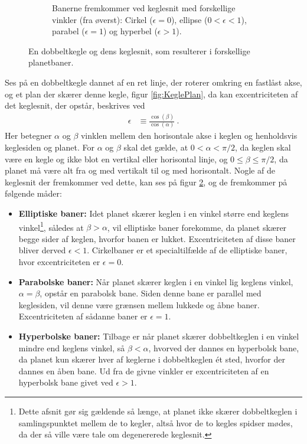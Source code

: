 \begin{figure}[h!]
\begin{subfigure}{0.45\textwidth}
		\caption{Banerne fremkommer ved keglesnit med forskellige vinkler (fra øverst): Cirkel ($\epsilon = 0$), ellipse ($0 < \epsilon < 1$), parabel ($\epsilon = 1$) og hyperbel ($\epsilon > 1$).}
		\label{fig:KegleOrbit}
	\end{subfigure}
	\caption{En dobbeltkegle og dens keglesnit, som resulterer i forskellige planetbaner.}
\end{figure}

Ses på en dobbeltkegle dannet af en ret linje, der roterer omkring en fastlåst akse, og et plan der skærer denne kegle, figur \ref{fig:KeglePlan}, da kan excentriciteten af det keglesnit, der opstår, beskrives ved
\begin{align}
	\epsilon &\equiv \frac{\cos(\beta)}{\cos(\alpha)} \: .
\end{align}
Her betegner $\alpha$ og $\beta$ vinklen mellem den horisontale akse i keglen og henholdsvis keglesiden og planet. For $\alpha$ og $\beta$ skal det gælde, at $0<\alpha<\pi/2$, da keglen skal være en kegle og ikke blot en vertikal eller horisontal linje, og $0 \le \beta \le \pi/2$, da planet må være alt fra og med vertikalt til og med horisontalt.
Nogle af de keglesnit der fremkommer ved dette, kan ses på figur \ref{fig:KegleOrbit}, og de fremkommer på følgende måder:
\begin{itemize}
	\item \textbf{Elliptiske baner:} Idet planet skærer keglen i en vinkel større end keglens vinkel\footnote{Dette afsnit gør sig gældende så længe, at planet ikke skærer dobbeltkeglen i samlingspunktet mellem de to kegler, altså hvor de to kegles spidser mødes, da der så ville være tale om degenererede keglesnit.}, således at $\beta > \alpha$, vil elliptiske baner forekomme, da planet skærer begge sider af keglen, hvorfor banen er lukket. Excentriciteten af disse baner bliver derved $\epsilon < 1$. Cirkelbaner er et specialtilfælde af de elliptiske baner, hvor excentriciteten er $\epsilon = 0$.
	\item \textbf{Parabolske baner:} Når planet skærer keglen i en vinkel lig keglens vinkel, $\alpha = \beta$, opstår en parabolsk bane. Siden denne bane er parallel med keglesiden, vil denne være grænsen mellem lukkede og åbne baner. Excentriciteten af sådanne baner er $\epsilon = 1$.
	\item \textbf{Hyperbolske baner:} Tilbage er når planet skærer dobbeltkeglen i en vinkel mindre end keglens vinkel, så $\beta < \alpha$, hvorved der dannes en hyperbolsk bane, da planet kun skærer hver af keglerne i dobbeltkeglen ét sted, hvorfor der dannes en åben bane. Ud fra de givne vinkler er excentriciteten af en hyperbolsk bane givet ved $\epsilon > 1$.
\end{itemize}

